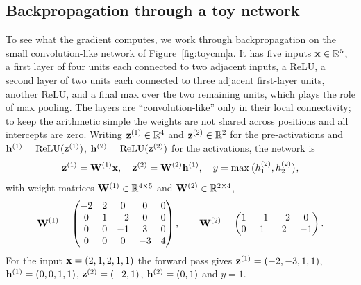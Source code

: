\subsection{Backpropagation through a toy network}

To see what the gradient computes, we work through backpropagation on the small convolution-like network of Figure~\ref{fig:toycnn}a. It has five inputs $\mathbf{x}\in\mathbb{R}^5$, a first layer of four units each connected to two adjacent inputs, a ReLU, a second layer of two units each connected to three adjacent first-layer units, another ReLU, and a final max over the two remaining units, which plays the role of max pooling. The layers are ``convolution-like'' only in their local connectivity; to keep the arithmetic simple the weights are not shared across positions and all intercepts are zero. Writing $\mathbf{z}^{(1)}\in\mathbb{R}^4$ and $\mathbf{z}^{(2)}\in\mathbb{R}^2$ for the pre-activations and $\mathbf{h}^{(1)}=\operatorname{ReLU}(\mathbf{z}^{(1)})$, $\mathbf{h}^{(2)}=\operatorname{ReLU}(\mathbf{z}^{(2)})$ for the activations, the network is
\begin{equation}
  \mathbf{z}^{(1)} = \mathbf{W}^{(1)}\mathbf{x}, \quad \mathbf{z}^{(2)} = \mathbf{W}^{(2)}\mathbf{h}^{(1)}, \quad y = \max\big(h^{(2)}_1, h^{(2)}_2\big),
\end{equation}
with weight matrices $\mathbf{W}^{(1)}\in\mathbb{R}^{4\times 5}$ and $\mathbf{W}^{(2)}\in\mathbb{R}^{2\times 4}$,
\begin{equation}
  \mathbf{W}^{(1)} = \begin{pmatrix} -2 & 2 & 0 & 0 & 0\\ 0 & 1 & -2 & 0 & 0\\ 0 & 0 & -1 & 3 & 0\\ 0 & 0 & 0 & -3 & 4 \end{pmatrix}, \qquad
  \mathbf{W}^{(2)} = \begin{pmatrix} 1 & -1 & -2 & 0\\ 0 & 1 & 2 & -1 \end{pmatrix}.
\end{equation}
For the input $\mathbf{x}=(2,1,2,1,1)$ the forward pass gives $\mathbf{z}^{(1)}=(-2,-3,1,1)$, $\mathbf{h}^{(1)}=(0,0,1,1)$, $\mathbf{z}^{(2)}=(-2,1)$, $\mathbf{h}^{(2)}=(0,1)$ and $y=1$.

